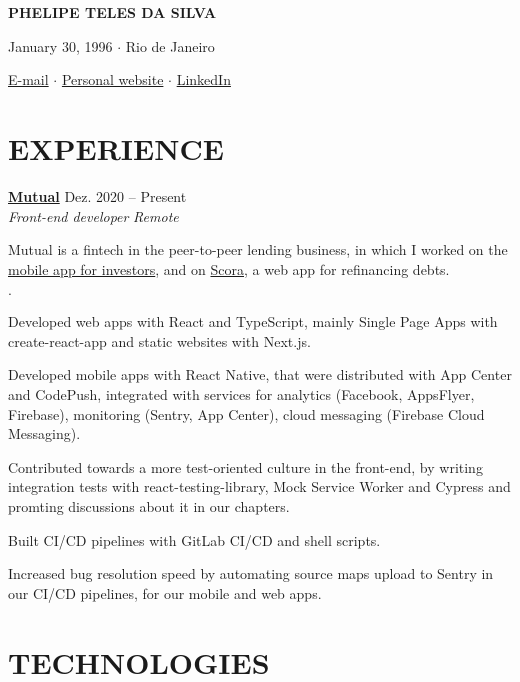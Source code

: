 \documentclass[12pt]{article}
\newenvironment{tightlist}
  {\begin{list}
    {$\cdot$}
    {
      \setlength{\leftmargin}{0em}
      \setlength{\itemsep}{\smallskipamount}
    }
  }
{\end{list}}
\begin{document}
\pagestyle{empty}

\centerline{\huge\bf PHELIPE TELES DA SILVA}
\medskip

\centerline{January 30, 1996 $\cdot$ Rio de Janeiro}
\smallskip

\centerline{
  \href{mailto:telesphelipe@gmail.com}{E-mail}
  $\cdot$
  \href{https://phelipetls.github.io}{Personal website}
  $\cdot$
  \href{https://linkedin.com/in/phelipeteles}{LinkedIn}
}
\smallskip

\section*{EXPERIENCE}

\textbf{\href{https://mutual.club}{Mutual}} \hfill Dez. 2020 -- Present \\
\textit{Front-end developer} \hfill \textit{Remote} {\parfillskip=0pt\par}

Mutual is a fintech in the peer-to-peer lending business, in which I worked on
the \href{https://mutual.club/en/invest.html}{mobile app for investors}, and on
\href{https://scora.com.br/}{Scora}, a web app for refinancing debts.

\begin{tightlist}
  \item Developed web apps with React and TypeScript, mainly Single Page Apps
    with create-react-app and static websites with Next.js.
  \item Developed mobile apps with React Native, that were distributed with App
    Center and CodePush, integrated with services for analytics (Facebook,
    AppsFlyer, Firebase), monitoring (Sentry, App Center), cloud messaging
    (Firebase Cloud Messaging).
  \item Contributed towards a more test-oriented culture in the front-end, by
    writing integration tests with react-testing-library, Mock Service Worker
    and Cypress and promting discussions about it in our chapters.
  \item Built CI/CD pipelines with GitLab CI/CD and shell scripts.
  \item Increased bug resolution speed by automating source maps upload to
    Sentry in our CI/CD pipelines, for our mobile and web apps.
\end{tightlist}

\section*{TECHNOLOGIES}
\end{document}
